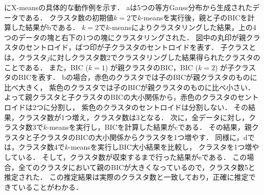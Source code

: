 にX-meansの具体的な動作例を示す．
aは5つの等方Gauss分布から生成されたデータである．
クラスタ数の初期値$k=2$で$k$-meansを実行後，親と子のBICを計算した結果がbである．
$k=2$で$k$-meansによりクラスタリングした結果，上の4つのデータの塊と右下の1つの塊にクラスタリングされた．
図中の丸印が親クラスタのセントロイド，ばつ印が子クラスタのセントロイドを表す．
子クラスとは，クラスタ$j$に対しクラスタ数2でクラスタリングした結果得られたクラスタのことである．
また，BIC ($k=1$) が親クラスタのBIC，BIC ($k=2$) が子クラスタのBICを表す．
bの場合，赤色のクラスタでは子のBICが親クラスタのものに比べ大きく，
紫色のクラスタでは子のBICが親クラスタのものに比べ小さい．
よって親クラスタと子クラスタのBICの大小関係から，赤色のクラスタのセントロイドは2つに分割し，
紫色のクラスタのセントロイドは分割しない．
その結果，クラスタ数が1つ増え，クラスタ数は3となる．
次に，全データに対し，クラスタ数3で$k$-meansを実行し，BICを計算した結果がcである．
その結果，親クラスタと子クラスタのBICの大小関係からクラスタを1つ増やす．
同様に，dでは，クラスタ数4で$k$-meansを実行しBIC大小結果を比較し，
クラスタを1つ増やしている．
そして，クラスタ数が収束するまで行った結果がeである．
この場合，全てのクラスタにおいて親のBICが大きくなっているので，クラスタ数5と推定された．
この推定結果は実際のクラスタ数と一致しており，正確に推定できていることがわかる．

